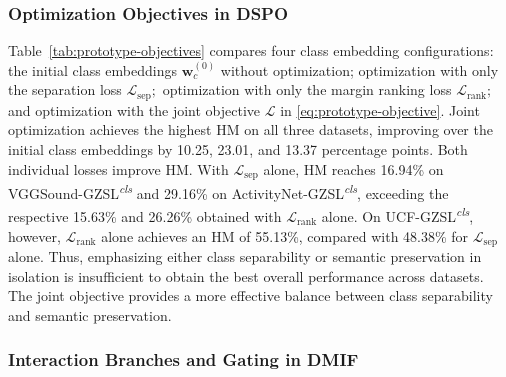 \subsubsection{Optimization Objectives in DSPO}\label{sec:optimization-objectives-in-dspo}


Table~\ref{tab:prototype-objectives} compares four class embedding configurations: the initial class embeddings ${\boldsymbol{w}}_{c}^{(0)}$ without optimization; optimization with only the separation loss ${\mathcal{L}}_{\mathrm{sep}};$ optimization with only the margin ranking loss ${\mathcal{L}}_{\mathrm{rank}};$ and optimization with the joint objective $\mathcal{L}$ in \eqref{eq:prototype-objective}. Joint optimization achieves the highest HM on all three datasets, improving over the initial class embeddings by 10.25, 23.01, and 13.37 percentage points. Both individual losses improve HM. With ${\mathcal{L}}_{\mathrm{sep}}$ alone, HM reaches 16.94\% on VGGSound-GZSL\textsuperscript{\textit{cls}} and 29.16\% on ActivityNet-GZSL\textsuperscript{\textit{cls}}, exceeding the respective 15.63\% and 26.26\% obtained with ${\mathcal{L}}_{\mathrm{rank}}$ alone. On UCF-GZSL\textsuperscript{\textit{cls}}, however, ${\mathcal{L}}_{\mathrm{rank}}$ alone achieves an HM of 55.13\%, compared with 48.38\% for ${\mathcal{L}}_{\mathrm{sep}}$ alone. Thus, emphasizing either class separability or semantic preservation in isolation is insufficient to obtain the best overall performance across datasets. The joint objective provides a more effective balance between class separability and semantic preservation.

\subsubsection{Interaction Branches and Gating in DMIF}\label{sec:interaction-branches-and-gating-in-dmif}


